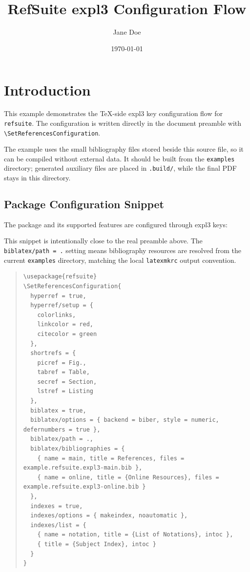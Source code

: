 \documentclass{article}
\newcounter{listing}
\begin{document}
\title{RefSuite expl3 Configuration Flow}
\author{Jane Doe}
\date{\today}
\maketitle

\tableofcontents

\section{Introduction}
\label{sec:introduction}

This example demonstrates the TeX-side expl3 key configuration flow for
\texttt{refsuite}. The configuration is written directly in the document preamble
with \verb|\SetReferencesConfiguration|.

The example uses the small bibliography files stored beside this source file, so
it can be compiled without external data.  It should be built from the
\texttt{examples} directory; generated auxiliary files are placed in
\texttt{.build/}, while the final PDF stays in this directory.

\subsection{Package Configuration Snippet}

The package and its supported features are configured through expl3 keys:

This snippet is intentionally close to the real preamble above.  The
\verb|biblatex/path = .| setting means bibliography resources are resolved from
the current \texttt{examples} directory, matching the local \texttt{latexmkrc}
output convention.

\begin{quote}
\begin{verbatim}
\usepackage{refsuite}
\SetReferencesConfiguration{
  hyperref = true,
  hyperref/setup = {
    colorlinks,
    linkcolor = red,
    citecolor = green
  },
  shortrefs = {
    picref = Fig.,
    tabref = Table,
    secref = Section,
    lstref = Listing
  },
  biblatex = true,
  biblatex/options = { backend = biber, style = numeric, defernumbers = true },
  biblatex/path = .,
  biblatex/bibliographies = {
    { name = main, title = References, files = example.refsuite.expl3-main.bib },
    { name = online, title = {Online Resources}, files = example.refsuite.expl3-online.bib }
  },
  indexes = true,
  indexes/options = { makeindex, noautomatic },
  indexes/list = {
    { name = notation, title = {List of Notations}, intoc },
    { title = {Subject Index}, intoc }
  }
}
\end{verbatim}
\end{quote}
\label{lst:configuration}
\end{document}
